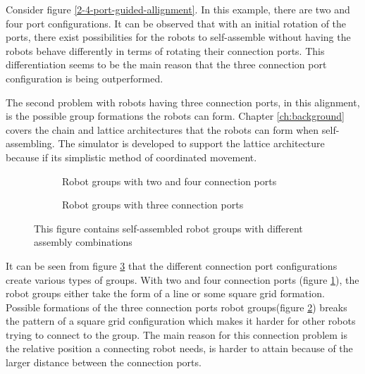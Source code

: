 Consider figure \ref{2-4-port-guided-allignment}.
In this example, there are two and four port configurations.
It can be observed that with an initial rotation of the ports, there exist possibilities for the robots to self-assemble without having the robots behave differently in terms of rotating their connection ports.
This differentiation seems to be the main reason that the three connection port configuration is being outperformed.

The second problem with robots having three connection ports, in this alignment, is the possible group formations the robots can form.
Chapter \ref{ch:background} covers the chain and lattice architectures that the robots can form when self-assembling. %
The simulator is developed to support the lattice architecture because if its simplistic method of coordinated movement.

\begin{figure}[H]
	\begin{subfigure}[t]{0.49\textwidth}
		\centering
		\caption{Robot groups with two and four connection ports}
		\label{2-4-port-architecture}
	\end{subfigure}
	\begin{subfigure}[t]{0.49\textwidth}
		\centering
		\caption{Robot groups with three connection ports}
		\label{3-port-architecture}
	\end{subfigure}
	\caption{This figure contains self-assembled robot groups with different assembly combinations}
	\label{port-architectures}
\end{figure}

It can be seen from figure \ref{port-architectures} that the different connection port configurations create various types of groups. 
With two and four connection ports (figure \ref{2-4-port-architecture}), the robot groups either take the form of a line or some square grid formation.
Possible formations of the three connection ports robot groups(figure \ref{3-port-architecture}) breaks the pattern of a square grid configuration which makes it harder for other robots trying to connect to the group.
The main reason for this connection problem is the relative position a connecting robot needs, is harder to attain because of the larger distance between the connection ports.

